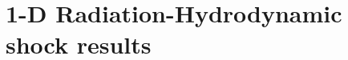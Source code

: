 \documentclass[times,doublespace]{fldauth}%
\begin{document}
\section{1-D Radiation-Hydrodynamic shock results}
\label{sec:num-rslt}
%
\end{document}

